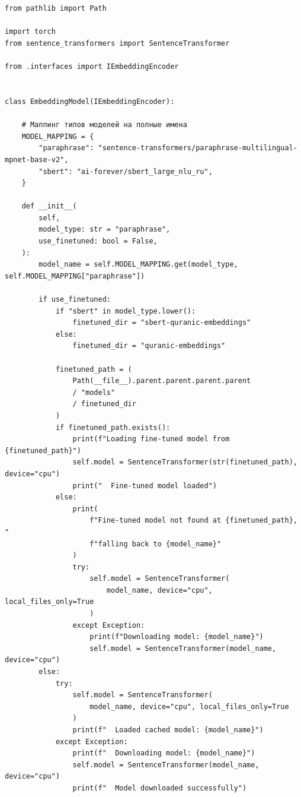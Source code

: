 \begin{lstlisting}[basicstyle=\tiny\ttfamily,breaklines=true]


from pathlib import Path

import torch
from sentence_transformers import SentenceTransformer

from .interfaces import IEmbeddingEncoder


class EmbeddingModel(IEmbeddingEncoder):

    # Маппинг типов моделей на полные имена
    MODEL_MAPPING = {
        "paraphrase": "sentence-transformers/paraphrase-multilingual-mpnet-base-v2",
        "sbert": "ai-forever/sbert_large_nlu_ru",
    }

    def __init__(
        self,
        model_type: str = "paraphrase",
        use_finetuned: bool = False,
    ):
        model_name = self.MODEL_MAPPING.get(model_type, self.MODEL_MAPPING["paraphrase"])

        if use_finetuned:
            if "sbert" in model_type.lower():
                finetuned_dir = "sbert-quranic-embeddings"
            else:
                finetuned_dir = "quranic-embeddings"

            finetuned_path = (
                Path(__file__).parent.parent.parent.parent
                / "models"
                / finetuned_dir
            )
            if finetuned_path.exists():
                print(f"Loading fine-tuned model from {finetuned_path}")
                self.model = SentenceTransformer(str(finetuned_path), device="cpu")
                print("  Fine-tuned model loaded")
            else:
                print(
                    f"Fine-tuned model not found at {finetuned_path}, "
                    f"falling back to {model_name}"
                )
                try:
                    self.model = SentenceTransformer(
                        model_name, device="cpu", local_files_only=True
                    )
                except Exception:
                    print(f"Downloading model: {model_name}")
                    self.model = SentenceTransformer(model_name, device="cpu")
        else:
            try:
                self.model = SentenceTransformer(
                    model_name, device="cpu", local_files_only=True
                )
                print(f"  Loaded cached model: {model_name}")
            except Exception:
                print(f"  Downloading model: {model_name}")
                self.model = SentenceTransformer(model_name, device="cpu")
                print(f"  Model downloaded successfully")


\end{lstlisting}
